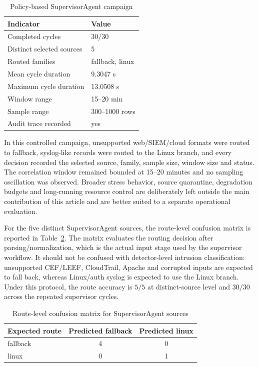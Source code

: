 \documentclass[conference]{IEEEtran}
\begin{document}
\begin{table}[t]
\caption{Policy-based SupervisorAgent campaign}
\label{tab:supervisor}
\centering
\scriptsize
\begin{tabular}{l l}
\toprule
\textbf{Indicator} & \textbf{Value} \\
\midrule
Completed cycles & 30/30 \\
Distinct selected sources & 5 \\
Routed families & fallback, linux \\
Mean cycle duration & 9.3047 s \\
Maximum cycle duration & 13.0508 s \\
Window range & 15--20 min \\
Sample range & 300--1000 rows \\
Audit trace recorded & yes \\
\bottomrule
\end{tabular}
\end{table}

In this controlled campaign, unsupported web/SIEM/cloud formats were routed to fallback, syslog-like records were routed to the Linux branch, and every decision recorded the selected source, family, sample size, window size and status. The correlation window remained bounded at 15--20 minutes and no sampling oscillation was observed. Broader stress behavior, source quarantine, degradation budgets and long-running resource control are deliberately left outside the main contribution of this article and are better suited to a separate operational evaluation.

For the five distinct SupervisorAgent sources, the route-level confusion matrix is reported in Table~\ref{tab:router_confusion}. The matrix evaluates the routing decision after parsing/normalization, which is the actual input stage used by the supervisor workflow. It should not be confused with detector-level intrusion classification: unsupported CEF/LEEF, CloudTrail, Apache and corrupted inputs are expected to fall back, whereas Linux/auth syslog is expected to use the Linux branch. Under this protocol, the route accuracy is $5/5$ at distinct-source level and $30/30$ across the repeated supervisor cycles.

\begin{table}[t]
\caption{Route-level confusion matrix for SupervisorAgent sources}
\label{tab:router_confusion}
\centering
\scriptsize
\begin{tabular}{lcc}
\toprule
\textbf{Expected route} & \textbf{Predicted fallback} & \textbf{Predicted linux} \\
\midrule
fallback & 4 & 0 \\
linux & 0 & 1 \\
\bottomrule
\end{tabular}
\end{table}
\end{document}
